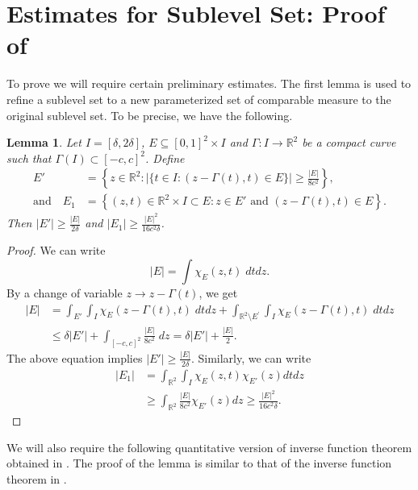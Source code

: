 \documentclass[a4paper,reqno]{amsart}
\newtheorem{lemma}[theorem]{Lemma}
\theoremstyle{definition}
\theoremstyle{remark}
\numberwithin{equation}{section}
\newcommand{\R}{{\mathbb {R}}}
\begin{document}
	\section{Estimates for Sublevel Set: Proof of }\label{sublevel:sec}
	To prove  we will require certain preliminary estimates. The first lemma is used to refine a sublevel set to a new parameterized set of comparable measure to the original sublevel set. To be precise, we have the following.
	\begin{lemma}\label{refinelemma}
		Let $I=[\delta,2\delta]$, $E \subseteq [0,1]^2 \times I$ and $\Gamma:I\to\R^2$ be a compact curve such that $\Gamma(I)\subset [-c,c]^2$. Define 
		\begin{align*}
			E'&=\left\{{z} \in \mathbb{R}^{2}: |\{t\in I:({z}-\Gamma(t),t) \in E\}|\geq\frac{|E|}{8c^2}\right\},\\
			\text{and}\quad E_1&=\left\{({z},t)\in \R^2\times I \subset E: {z}\in E' \text{ and }({z}-\Gamma(t),t)\in E\right\}.
		\end{align*}
		Then $|E'|\geq\frac{|E|}{2\delta}$ and $|E_1|\geq\frac{|E|^2}{16c^2\delta}$.
	\end{lemma}
	\begin{proof}
		We can write 
		\[|E|=\int \chi_{E}({z}, t)\;dtd{z}.\]
		By a change of variable ${z}\to {z}-\Gamma(t)$, we get
		\begin{align*}
			|E| & =\int_{E'} \int_{I} \chi_{E}({z}-\Gamma(t), t)\;dtd{z}+\int_{\R^{2}\setminus E^{\prime}} \int_{I} \chi_{E}({z}-\Gamma(t), t)\;dtd{z} \\	&\leq\delta\left|E'\right|+\int_{[-c,c]^2}\frac{|E|}{8c^2}\;d{z}= \delta|E'|+\frac{|E|}{2}.
		\end{align*}
		The above equation implies $|E'|\geq\frac{|E|}{2\delta}$. Similarly, we can write
		\begin{align*}
			\left|E_{1}\right|& =\int_{\R^{2}} \int_{I} \chi_{E}({z},t) \chi_{E'}({z}) d t d{z} \\
			& \geq \int_{\R^{2}} \frac{|E|}{8c^2} \chi_{E'}({z}) d {z} \geq \frac{|E|^{2}}{16c^2 \delta}.
		\end{align*}
	\end{proof}
	We will also require the following quantitative version of inverse function theorem obtained in \cite[Lemma B.1]{CG}. The proof of the lemma is similar to that of the inverse function theorem in \cite[page 595]{Christ1985}.
\end{document}
